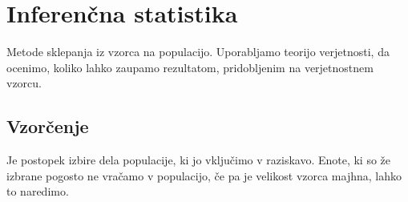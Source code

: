 \section{Inferenčna statistika}

Metode sklepanja iz vzorca na populacijo. Uporabljamo teorijo verjetnosti, da ocenimo, koliko lahko zaupamo rezultatom, pridobljenim na verjetnostnem vzorcu.

\subsection*{Vzorčenje}

Je postopek izbire dela populacije, ki jo vključimo v raziskavo. Enote, ki so že izbrane pogosto ne vračamo v populacijo, če pa je velikost vzorca majhna, lahko to naredimo.

